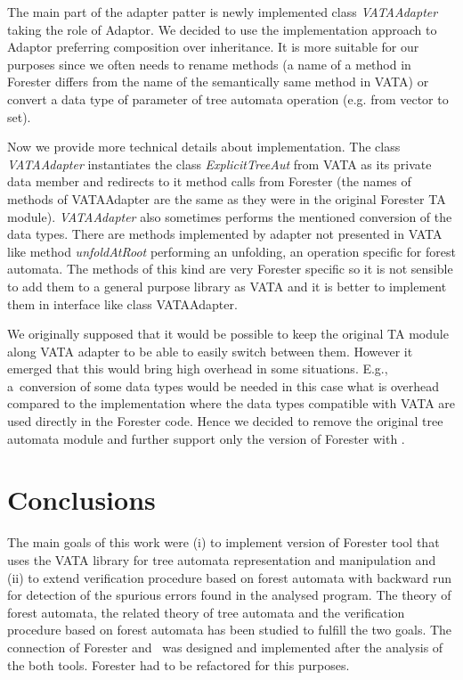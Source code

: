 \documentclass[fleqn,11pt]{ExcelAtFIT} %
\begin{document}
The main part of the adapter patter is newly implemented class \emph{VATAAdapter} taking the role of Adaptor.
We decided to use the implementation approach to Adaptor preferring composition over inheritance.
It is more suitable for our purposes since we often needs to rename methods 
(a name of a method in Forester differs from the name of the semantically same method in VATA)
or convert a data type of parameter of tree automata operation (e.g. from vector to set). 

Now we provide more technical details about implementation.
The class \emph{VATAAdapter} instantiates the class \emph{ExplicitTreeAut} from VATA as its private data member
and redirects to it method calls from Forester (the names of methods of VATAAdapter are the same as they were
in the original Forester TA module).
\emph{VATAAdapter} also sometimes performs the mentioned conversion of the data types.
There are methods implemented by adapter not presented in VATA like method \emph{unfoldAtRoot}
performing an unfolding, an operation specific for forest automata.
The methods of this kind are very Forester specific so it is not sensible to add them to a general purpose library as VATA
and it is better to implement them in interface like class VATAAdapter.

We originally supposed that it would be possible to keep the original TA module along VATA adapter
to be able to easily switch between them.
However it emerged that this would bring high overhead in some situations.
E.g., a~conversion of some data types would be needed in this case
what is overhead compared to the implementation where the data types compatible with VATA are used directly in the Forester code.
Hence we decided to remove the original tree automata module and further support only the version of Forester with \vata.

\section{Conclusions}
\label{sec:concl}

The main goals of this work were (i) to implement version of Forester tool that uses the VATA library for tree automata representation and manipulation
and (ii) to extend verification procedure based on forest automata with backward run for detection of the spurious errors found in the analysed program.
The theory of forest automata, the related theory of tree automata and the verification procedure based on forest automata has been studied to fulfill the two goals.
The connection of Forester and \vata\ was designed and implemented after the analysis of the both tools.
Forester had to be refactored for this purposes.
\end{document}
